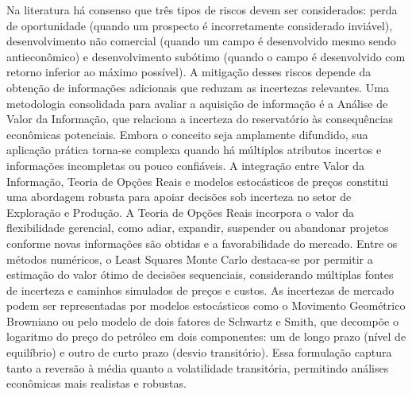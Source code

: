 Na literatura há consenso que três tipos de riscos devem ser considerados: perda de oportunidade (quando um prospecto é incorretamente considerado inviável), desenvolvimento não comercial (quando um campo é desenvolvido mesmo sendo antieconômico) e desenvolvimento subótimo (quando o campo é desenvolvido com retorno inferior ao máximo possível). A mitigação desses riscos depende da obtenção de informações adicionais que reduzam as incertezas relevantes. Uma metodologia consolidada para avaliar a aquisição de informação é a Análise de Valor da Informação, que relaciona a incerteza do reservatório às consequências econômicas potenciais. Embora o conceito seja amplamente difundido, sua aplicação prática torna-se complexa quando há múltiplos atributos incertos e informações incompletas ou pouco confiáveis. A integração entre Valor da Informação, Teoria de Opções Reais e modelos estocásticos de preços constitui uma abordagem robusta para apoiar decisões sob incerteza no setor de Exploração e Produção. A Teoria de Opções Reais incorpora o valor da flexibilidade gerencial, como adiar, expandir, suspender ou abandonar projetos conforme novas informações são obtidas e a favorabilidade do mercado. Entre os métodos numéricos, o Least Squares Monte Carlo destaca-se por permitir a estimação do valor ótimo de decisões sequenciais, considerando múltiplas fontes de incerteza e caminhos simulados de preços e custos. As incertezas de mercado podem ser representadas por modelos estocásticos como o Movimento Geométrico Browniano ou pelo modelo de dois fatores de Schwartz e Smith, que decompõe o logaritmo do preço do petróleo em dois componentes: um de longo prazo (nível de equilíbrio) e outro de curto prazo (desvio transitório). Essa formulação captura tanto a reversão à média quanto a volatilidade transitória, permitindo análises econômicas mais realistas e robustas.

